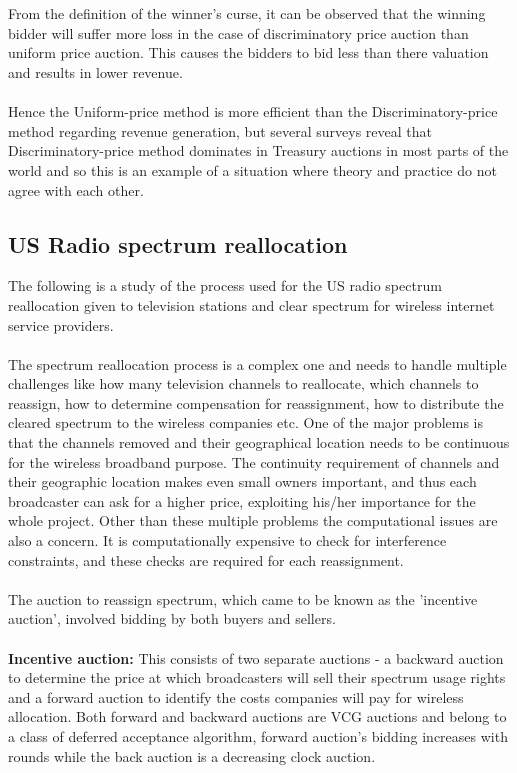 \documentclass[a4paper]{article}
\begin{document}
\\\\
From the definition of the winner's curse, it can be observed that the winning bidder will suffer more loss in the case of discriminatory price auction than uniform price auction. This causes the bidders to bid less than there valuation and results in lower revenue.
\\\\
Hence the Uniform-price method is more efficient than the Discriminatory-price method regarding revenue generation, but several surveys reveal that Discriminatory-price method dominates in Treasury auctions in most parts of the world and so this is an example of a situation where theory and practice do not agree with each other.

\pagebreak
\subsection*{US Radio spectrum reallocation}

The following is a study of the process used for the US radio spectrum reallocation given to television stations and clear spectrum for wireless internet service providers.
\\\\
The spectrum reallocation process is a complex one and needs to handle multiple challenges like how many television channels to reallocate, which channels to reassign, how to determine compensation for reassignment, how to distribute the cleared spectrum to the wireless companies etc. One of the major problems is that the channels removed and their geographical location needs to be continuous for the wireless broadband purpose. The continuity requirement of channels and their geographic location makes even small owners important, and thus each broadcaster can ask for a higher price, exploiting his/her importance for the whole project. Other than these multiple problems the computational issues are also a concern. It is computationally expensive to check for interference constraints, and these checks are required for each reassignment.
\\\\
The auction to reassign spectrum, which came to be known as the 'incentive auction', involved bidding by both buyers and sellers.
\\\\
\textbf{Incentive auction:} This consists of two separate auctions - a backward auction to determine the price at which broadcasters will sell their spectrum usage rights and a forward auction to identify the costs companies will pay for wireless allocation. Both forward and backward auctions are VCG auctions and belong to a class of deferred acceptance algorithm, forward auction's bidding increases with rounds while the back auction is a decreasing clock auction.
\end{document}
